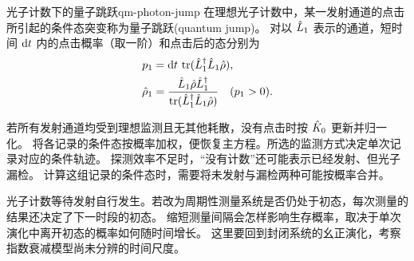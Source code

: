 \begin{definition}{光子计数下的量子跳跃}{qm-photon-jump}
    在理想光子计数中，某一发射通道的点击所引起的条件态突变称为量子跳跃(quantum jump)。
    对以 $\hat{L}_1$ 表示的通道，短时间 $\mathop{}\!\mathrm{d} t$ 内的点击概率（取一阶）和点击后的态分别为
    \begin{subequations}
        \begin{align}
            p_1 &= \mathop{}\!\mathrm{d} t\,\operatorname{tr}(\hat{L}_1^\dagger \hat{L}_1\hat{\rho}),\\
            \hat{\rho}_1 &= \frac{\hat{L}_1\hat{\rho} \hat{L}_1^\dagger}{\operatorname{tr}(\hat{L}_1^\dagger \hat{L}_1\hat{\rho})}\quad(p_1 > 0).
        \end{align}
    \end{subequations}
\end{definition}
若所有发射通道均受到理想监测且无其他耗散，没有点击时按 $\hat{K}_0$ 更新并归一化。
将各记录的条件态按概率加权，便恢复主方程。所选的监测方式决定单次记录对应的条件轨迹。
探测效率不足时，“没有计数”还可能表示已经发射、但光子漏检。
计算这组记录的条件态时，需要将未发射与漏检两种可能按概率合并。

光子计数等待发射自行发生。若改为周期性测量系统是否仍处于初态，每次测量的结果还决定了下一时段的初态。
缩短测量间隔会怎样影响生存概率，取决于单次演化中离开初态的概率如何随时间增长。
这里要回到封闭系统的幺正演化，考察指数衰减模型尚未分辨的时间尺度。

